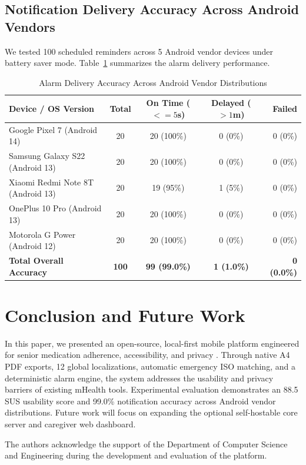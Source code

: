 \documentclass[10pt]{article}
\begin{document}
\subsection{Notification Delivery Accuracy Across Android Vendors}
We tested 100 scheduled reminders across 5 Android vendor devices under battery saver mode. Table~\ref{tab:oem} summarizes the alarm delivery performance.

\begin{table}[!ht]
\centering
\caption{Alarm Delivery Accuracy Across Android Vendor Distributions}
\label{tab:oem}
\begin{tabular}{|l|c|c|c|r|}
\hline
\textbf{Device / OS Version} & \textbf{Total} & \textbf{On Time ($<=5$s)} & \textbf{Delayed ($>1$m)} & \textbf{Failed} \\ \hline
Google Pixel 7 (Android 14) & 20 & 20 (100\%) & 0 (0\%) & 0 (0\%) \\ \hline
Samsung Galaxy S22 (Android 13) & 20 & 20 (100\%) & 0 (0\%) & 0 (0\%) \\ \hline
Xiaomi Redmi Note 8T (Android 13) & 20 & 19 (95\%) & 1 (5\%) & 0 (0\%) \\ \hline
OnePlus 10 Pro (Android 13) & 20 & 20 (100\%) & 0 (0\%) & 0 (0\%) \\ \hline
Motorola G Power (Android 12) & 20 & 20 (100\%) & 0 (0\%) & 0 (0\%) \\ \hline
\textbf{Total Overall Accuracy} & \textbf{100} & \textbf{99 (99.0\%)} & \textbf{1 (1.0\%)} & \textbf{0 (0.0\%)} \\ \hline
\end{tabular}
\end{table}

\section{Conclusion and Future Work}

In this paper, we presented an open-source, local-first mobile platform engineered for senior medication adherence, accessibility, and privacy \cite{dosezy2026github}. Through native A4 PDF exports, 12 global localizations, automatic emergency ISO matching, and a deterministic alarm engine, the system addresses the usability and privacy barriers of existing mHealth tools. Experimental evaluation demonstrates an 88.5 SUS usability score \cite{brooke1996sus} and 99.0\% notification accuracy across Android vendor distributions. Future work will focus on expanding the optional self-hostable core server and caregiver web dashboard.

\begin{acknowledgements}
The authors acknowledge the support of the Department of Computer Science and Engineering during the development and evaluation of the platform.
\end{acknowledgements}



\end{document}
